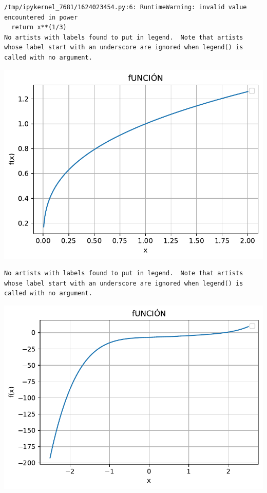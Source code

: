 \documentclass[
]{article}
\begin{document}
\begin{verbatim}
/tmp/ipykernel_7681/1624023454.py:6: RuntimeWarning: invalid value encountered in power
  return x**(1/3)
No artists with labels found to put in legend.  Note that artists whose label start with an underscore are ignored when legend() is called with no argument.
\end{verbatim}

\includegraphics{taller_files/figure-pdf/cell-4-output-2.pdf}

\begin{verbatim}
No artists with labels found to put in legend.  Note that artists whose label start with an underscore are ignored when legend() is called with no argument.
\end{verbatim}

\includegraphics{taller_files/figure-pdf/cell-5-output-2.pdf}
\end{document}
